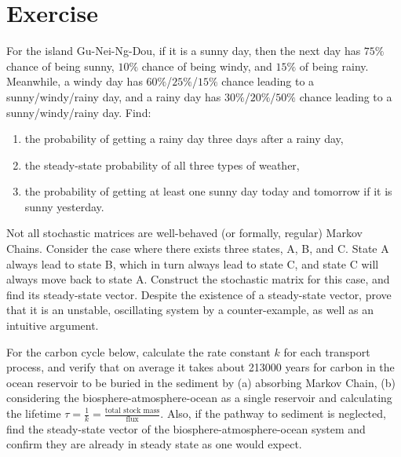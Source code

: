 \section{Exercise}

\begin{Exercise}
For the island Gu-Nei-Ng-Dou, if it is a sunny day, then the next day has $75\%$ chance of being sunny, $10\%$ chance of being windy, and $15\%$ of being rainy. Meanwhile, a windy day has $60\%$/$25\%$/$15\%$ chance leading to a sunny/windy/rainy day, and a rainy day has $30\%$/$20\%$/$50\%$ chance leading to a sunny/windy/rainy day. Find:
\begin{enumerate}[label=(\alph*)]
\item the probability of getting a rainy day three days after a rainy day,
\item the steady-state probability of all three types of weather,
\item the probability of getting at least one sunny day today and tomorrow if it is sunny yesterday.
\end{enumerate}
\end{Exercise}

\begin{Exercise}
Not all stochastic matrices are well-behaved (or formally, regular) Markov Chains. Consider the case where there exists three states, A, B, and C. State A always lead to state B, which in turn always lead to state C, and state C will always move back to state A. Construct the stochastic matrix for this case, and find its steady-state vector. Despite the existence of a steady-state vector, prove that it is an unstable, oscillating system by a counter-example, as well as an intuitive argument.
\end{Exercise}

\begin{Exercise}
For the carbon cycle below, calculate the rate constant $k$ for each transport process, and verify that on average it takes about 213000 years for carbon in the ocean reservoir to be buried in the sediment by (a) absorbing Markov Chain, (b) considering the biosphere-atmosphere-ocean as a single reservoir and calculating the lifetime $\tau = \frac{1}{k} = \frac{\text{total stock mass}}{\text{flux}}$. Also, if the pathway to sediment is neglected, find the steady-state vector of the biosphere-atmosphere-ocean system and confirm they are already in steady state as one would expect.
\begin{center}
\end{center}
\end{Exercise}

